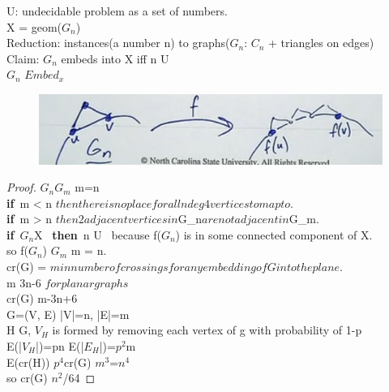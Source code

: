 \documentclass{article}
\begin{document}
U: undecidable problem as a set of numbers.\\
X = geom($G_n$)\\
Reduction: instances(a number n) to graphs($G_n$: $C_n$ + triangles on edges)\\
Claim: $G_n$ embeds into X iff n \in U\\$G_n$ \in $Embed_x$
    \begin{figure}[h!]
		\begin{center}
			\includegraphics[scale=0.3]{images/fig3}
		\end{center}
	\end{figure}
\begin{proof}
$G_n$\hookrightarrow$G_m$ \implies m=n\\
{\bf if}\ m < n $ then there is no place for all n deg 4 vertices to map to.$\\
{\bf if}\ m > n $ then 2 adjacent vertices in $G_n$ are not adjacent in $G_m$.$\\
{\bf if}\ $G_n$\hookrightarrow X \ {\bf then}\ n \in U \ because f($G_n$) is in some connected component of X.\\
so f($G_n$) \subseteq $G_m$ \implies m = n.\\
cr(G) = $min number of crossings for any embedding of G into the plane.$\\
m \leq 3n-6 $ for planar graphs$ \\
cr(G) \geq m-3n+6\\
G=(V, E) |V|=n, |E|=m\\
H \subseteq G, $V_H$ is formed by removing each vertex of g with probability of 1-p\\
E(|$V_H$|)=pn E(|$E_H$|)=$p^2$m\\
E(cr(H)) \leq $p^4$cr(G) $m^3$=$n^4$\\
so cr(G) \geq $n^2$/64
\end{proof}
\end{document}
